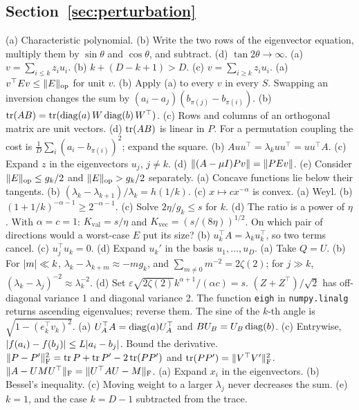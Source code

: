 \subsection*{Section~\ref{sec:perturbation}}
\begin{hintlist}
 (a) Characteristic polynomial. (b) Write the two rows of the eigenvector equation,
multiply them by $\sin\theta$ and $\cos\theta$, and subtract. (d) $\tan2\theta\to\infty$.
 (a) $v=\sum_{i\le k}z_iu_i$. (b) $k+(D-k+1)>D$. (c) $v=\sum_{i\ge k}z_iu_i$.
 (a) $v^\top Ev\le\lVert E\rVert_{\mathrm{op}}$ for unit $v$. (b) Apply (a) to every $v$ in every $S$.
 Swapping an inversion changes the sum by $(a_i-a_j)(b_{\pi(j)}-b_{\pi(i)})$.
 (b) $\operatorname{tr}(AB)=\operatorname{tr}(\operatorname{diag}(a)\,W\operatorname{diag}(b)\,W^\top)$. (c) Rows and columns of an orthogonal matrix
are unit vectors. (d) $\operatorname{tr}(AB)$ is linear in $P$.
 For a permutation coupling the cost is $\frac1D\sum_i(a_i-b_{\pi(i)})^2$; expand the
square.
 (b) $Auu^\top=\lambda_kuu^\top=uu^\top A$. (c) Expand $z$ in the eigenvectors $u_j$,
$j\ne k$. (d) $\lVert(A-\mu I)Pv\rVert=\lVert PEv\rVert$. (e) Consider $\lVert E\rVert_{\mathrm{op}}\le g_k/2$ and $\lVert E\rVert_{\mathrm{op}}>g_k/2$
separately.
 (a) Concave functions lie below their tangents. (b) $(\lambda_k-\lambda_{k+1})/\lambda_k=h(1/k)$.
(c) $x\mapsto cx^{-\alpha}$ is convex.
 (a) Weyl. (b) $(1+1/k)^{-\alpha-1}\ge2^{-\alpha-1}$. (c) Solve $2\eta/g_k\le s$ for
$k$. (d) The ratio is a power of $\eta$.
 With $\alpha=c=1$: $K_{\text{val}}=s/\eta$ and $K_{\text{vec}}=(s/(8\eta))^{1/2}$. On
which pair of directions would a worst-case $E$ put its size?
 (b) $u_k^\top A=\lambda_ku_k^\top$, so two terms cancel. (c) $u_j^\top u_k=0$. (d)
Expand $u_k'$ in the basis $u_1,\dots,u_D$.
 (a) Take $Q=U$. (b) For $\lvert m\rvert\ll k$, $\lambda_k-\lambda_{k+m}\approx-mg_k$, and
$\sum_{m\ne0}m^{-2}=2\zeta(2)$; for $j\gg k$, $(\lambda_k-\lambda_j)^{-2}\approx\lambda_k^{-2}$. (d) Set
$\varepsilon\sqrt{2\zeta(2)}k^{\alpha+1}/(\alpha c)=s$.
 $(Z+Z^\top)/\sqrt2$ has off-diagonal variance 1 and diagonal variance 2.
The function \texttt{eigh} in \texttt{numpy.linalg} returns ascending eigenvalues; reverse them. The sine of the $k$-th angle is
$\sqrt{1-(e_k^\top v_k)^2}$.
 (a) $U_A^\top A=\operatorname{diag}(a)U_A^\top$ and $BU_B=U_B\operatorname{diag}(b)$. (c) Entrywise,
$\lvert f(a_i)-f(b_j)\rvert\le L\lvert a_i-b_j\rvert$.
 Bound the derivative.
 $\lVert P-P'\rVert_{\mathrm{F}}^2=\operatorname{tr} P+\operatorname{tr} P'-2\operatorname{tr}(PP')$ and $\operatorname{tr}(PP')=\lVert V^\top V'\rVert_{\mathrm{F}}^2$.
 $\lVert A-UMU^\top\rVert_{\mathrm{F}}=\lVert U^\top AU-M\rVert_{\mathrm{F}}$.
 (a) Expand $x_i$ in the eigenvectors. (b) Bessel's inequality. (c) Moving weight to a
larger $\lambda_j$ never decreases the sum. (e) $k=1$, and the case $k=D-1$ subtracted from the trace.

\end{hintlist}

